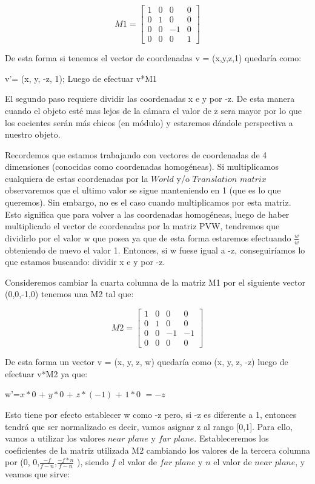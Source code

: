 \documentclass[a4paper]{article}
\newcounter{col}
\begin{document}
\[
M1 =
\begin{bmatrix}
1 & 0 & 0 & 0 \\
0 & 1 & 0 & 0 \\
0 & 0 & -1 & 0 \\
0 & 0 & 0 & 1  
\end{bmatrix}
\]


De esta forma si tenemos el vector de coordenadas v = (x,y,z,1) quedaría como: \newline

v'= (x, y, -z, 1); Luego de efectuar v*M1\newline

El segundo paso requiere dividir las coordenadas x e y por -z. De esta manera cuando el objeto esté mas lejos de la cámara el valor de z sera mayor por lo que los cocientes serán más chicos (en módulo) y estaremos dándole perspectiva a nuestro objeto.
\par Recordemos que estamos trabajando con vectores de coordenadas de 4 dimensiones (conocidas como coordenadas homogéneas). Si multiplicamos cualquiera de estas coordenadas por la $World$ y/o $Translation$ $matrix$ observaremos que el ultimo valor se sigue manteniendo en 1 (que es lo que queremos). Sin embargo, no es el caso cuando multiplicamos por esta matriz. Esto significa que para volver a las coordenadas homogéneas, luego de haber multiplicado el vector de coordenadas por la matriz PVW, tendremos que dividirlo por el valor w que posea ya que de esta forma estaremos efectuando $\frac{w}{w}$ obteniendo de nuevo el valor 1. Entonces, si w fuese igual a -z, conseguiríamos lo que estamos buscando: dividir x e y por -z.\newline

Consideremos cambiar la cuarta columna de la matriz M1 por el siguiente vector (0,0,-1,0) tenemos una M2 tal que:

\[
M2 =
\begin{bmatrix}
1 & 0 & 0 & 0 \\
0 & 1 & 0 & 0 \\
0 & 0 & -1 & -1 \\
0 & 0 & 0 & 0 
\end{bmatrix}
\]

De esta forma un vector v = (x, y, z, w) quedaría como (x, y, z, -z) luego de efectuar v*M2 ya que:\newline

w'=$x*0$ $+$ $y*0$ $+$ $z*(-1)$ $+$ $1*0$ $=-z$

Esto tiene por efecto establecer w como -z pero, si -z es diferente a 1, entonces tendrá que ser normalizado es decir, vamos asignar z al rango [0,1]. Para ello, vamos a utilizar los valores $near$ $plane$ y $far$ $plane$. \newline
Estableceremos los coeficientes de la matriz utilizada M2 cambiando los valores de la tercera columna por (0, 0,$\frac{-f}{f-n}$,$\frac{-f*n}{f-n}$ ), siendo $f$ el valor de $far$ $plane$ y $n$ el valor de $near$ $plane$, y veamos que sirve:\newline
\end{document}
